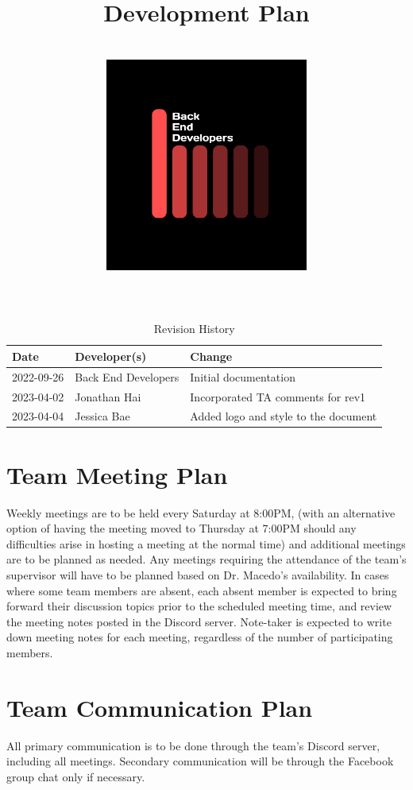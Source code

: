 \documentclass[12pt]{article}
\title{\textbf{Development Plan\\\progname \\ \vspace{2cm} \includegraphics[width=0.5\textwidth]{../logo.jpg}}}
\author{\authname}
\date{}
\begin{document}
\color{white}\maketitle
\color{black}
\newpage

\tableofcontents
\listoftables

\newpage

\begin{table}[hp]
\caption{Revision History} \label{TblRevisionHistory}
\begin{tabularx}{\textwidth}{llX}
\toprule
\textbf{Date} & \textbf{Developer(s)} & \textbf{Change}\\
\midrule
2022-09-26 & Back End Developers & Initial documentation\\
2023-04-02 & Jonathan Hai & Incorporated TA comments for rev1\\
2023-04-04 & Jessica Bae & Added logo and style to the document\\
\bottomrule
\end{tabularx}
\end{table}

\pagebreak

\section{Team Meeting Plan}
Weekly meetings are to be held every Saturday at 8:00PM, (with an alternative option of having the meeting moved to Thursday at 7:00PM should any difficulties arise in hosting a meeting at the normal time) and additional meetings are to be planned as needed. Any meetings requiring the attendance of the team's supervisor will have to be planned based on Dr. Macedo's availability. In cases where some team members are absent, each absent member is expected to bring forward their discussion topics prior to the scheduled meeting time, and review the meeting notes posted in the Discord server. Note-taker is expected to write down meeting notes for each meeting, regardless of the number of participating members.\\

\pagebreak

\section{Team Communication Plan}
All primary communication is to be done through the team's Discord server, including all meetings. Secondary communication will be through the Facebook group chat only if necessary.\\
\end{document}
